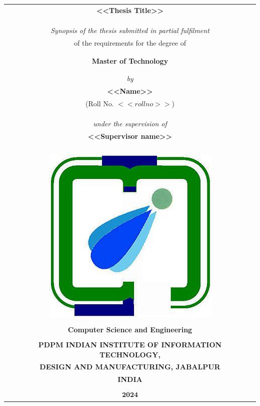 
\begin{titlepage}
\thispagestyle{empty}


\begin{table}
	\centering
	\begin{tabular}{c}
		\Large \textbf{<<Thesis Title>>} \\
		\\
		\\
            \\
		\it Synopsis of the thesis submitted in partial fulfilment \\of the requirements for the degree of	\\
            \\
            \\
           
		\bf Master of Technology	\\
		\\
		\\
		
		\it by	\\
		\large \bf {<<Name>>}	\\
		(Roll No. $<<roll no>>$)	\\
		\\
		\\
		\\
		\it under the supervision of	\\
		\large \bf <<Supervisor name>>\\

		\\
		\\
		\\
		\\
		\includegraphics[width=.17\textwidth]{images/iiitdmj.png}	\\
		\\
		\normalsize{\textbf{Computer Science and Engineering}}	\\
		\\
		\bf PDPM INDIAN INSTITUTE OF INFORMATION TECHNOLOGY,	\\
		\bf DESIGN AND MANUFACTURING, JABALPUR	\\
		\bf INDIA	\\
		\\
		$\mathbf{2024}$	\\
	\end{tabular}
\end{table}
\pagebreak


\thispagestyle{empty}
\end{titlepage}

